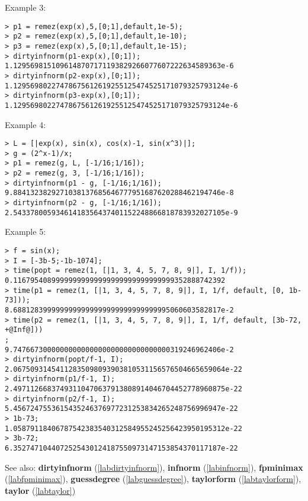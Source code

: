 \noindent Example 3: 
\begin{center}\begin{minipage}{15cm}\begin{Verbatim}[frame=single]
> p1 = remez(exp(x),5,[0;1],default,1e-5);
> p2 = remez(exp(x),5,[0;1],default,1e-10);
> p3 = remez(exp(x),5,[0;1],default,1e-15);
> dirtyinfnorm(p1-exp(x),[0;1]);
1.1295698151096148707171193829266077607222634589363e-6
> dirtyinfnorm(p2-exp(x),[0;1]);
1.12956980227478675612619255125474525171079325793124e-6
> dirtyinfnorm(p3-exp(x),[0;1]);
1.12956980227478675612619255125474525171079325793124e-6
\end{Verbatim}
\end{minipage}\end{center}
\noindent Example 4: 
\begin{center}\begin{minipage}{15cm}\begin{Verbatim}[frame=single]
> L = [|exp(x), sin(x), cos(x)-1, sin(x^3)|];
> g = (2^x-1)/x;
> p1 = remez(g, L, [-1/16;1/16]);
> p2 = remez(g, 3, [-1/16;1/16]);
> dirtyinfnorm(p1 - g, [-1/16;1/16]);
9.8841323829271038137685646777951687620288462194746e-8
> dirtyinfnorm(p2 - g, [-1/16;1/16]);
2.54337800593461418356437401152248866818783932027105e-9
\end{Verbatim}
\end{minipage}\end{center}
\noindent Example 5: 
\begin{center}\begin{minipage}{15cm}\begin{Verbatim}[frame=single]
> f = sin(x);
> I = [-3b-5;-1b-1074];
> time(popt = remez(1, [|1, 3, 4, 5, 7, 8, 9|], I, 1/f));
0.11679540899999999999999999999999999999352888742392
> time(p1 = remez(1, [|1, 3, 4, 5, 7, 8, 9|], I, 1/f, default, [0, 1b-73]));
8.6881283999999999999999999999999999995060603582817e-2
> time(p2 = remez(1, [|1, 3, 4, 5, 7, 8, 9|], I, 1/f, default, [3b-72, +@Inf@]))
;
9.7476673000000000000000000000000000000319246962406e-2
> dirtyinfnorm(popt/f-1, I);
2.06750931454112835098093903810531156576504665659064e-22
> dirtyinfnorm(p1/f-1, I);
2.49711266837493110470637913808914046704452778960875e-22
> dirtyinfnorm(p2/f-1, I);
5.4567247553615435246376977231253834265248756996947e-22
> 1b-73;
1.05879118406787542383540312584955245256423950195312e-22
> 3b-72;
6.3527471044072525430124187550973147153854370117187e-22
\end{Verbatim}
\end{minipage}\end{center}
See also: \textbf{dirtyinfnorm} (\ref{labdirtyinfnorm}), \textbf{infnorm} (\ref{labinfnorm}), \textbf{fpminimax} (\ref{labfpminimax}), \textbf{guessdegree} (\ref{labguessdegree}), \textbf{taylorform} (\ref{labtaylorform}), \textbf{taylor} (\ref{labtaylor})
